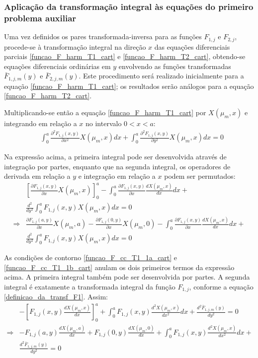 \subsubsection{Aplicação da transformação integral às equações do primeiro problema auxiliar}\label{secao_reciprocidade_F}

Uma vez definidos os pares transformada-inversa para as funções $F_{1,j}$ e $F_{2,j}$, procede-se à transformação integral na direção $x$ das equações
diferenciais parciais \eqref{funcao_F_harm_T1_cart} e \eqref{funcao_F_harm_T2_cart}, obtendo-se equações diferenciais ordinárias em $y$ envolvendo
as funções transformadas $\bar{F}_{1,j,m}(y)$ e $\bar{F}_{2,j,m}(y)$. Este procedimento será realizado inicialmente para a equação \eqref{funcao_F_harm_T1_cart};
os resultados serão análogos para a equação \eqref{funcao_F_harm_T2_cart}.

Multiplicando-se então a equação \eqref{funcao_F_harm_T1_cart} por $X(\mu_m, x)$ e integrando em relação a $x$ no intervalo $0 < x < a$: 
\begin{align}
	& \int_0^a  \frac{\partial^2 F_{1,j}(x, y)}{\partial x^2}X(\mu_m, x)dx + \int_0^a \frac{\partial^2 F_{1,j}(x, y)}{\partial y^2}X(\mu_m, x)dx = 0 
\end{align}

Na expressão acima, a primeira integral pode ser desenvolvida através de integração por partes, enquanto que na segunda integral, os operadores de derivada
em relação a $y$ e integração em relação a $x$ podem ser permutados:
\begin{align}
	& \left[ \frac{\partial F_{1,j}(x, y)}{\partial x}X(\mu_m, x) \right]_0^a
	-
	\int_0^a  \frac{\partial F_{1,j}(x, y)}{\partial x}\frac{dX(\mu_m, x)}{dx} dx + \nonumber \\
	& \frac{d^2}{d y^2}\int_0^a F_{1,j}(x, y)X(\mu_m, x)dx = 0 \nonumber \\ 
	\Rightarrow & \frac{\partial F_{1,j}(a, y)}{\partial x}X(\mu_m, a) - \frac{\partial F_{1,j}(0, y)}{\partial x}X(\mu_m, 0)
	-
	\int_0^a  \frac{\partial F_{1,j}(x, y)}{\partial x}\frac{dX(\mu_m, x)}{dx} dx + \nonumber \\
	& \frac{d^2}{d y^2}\int_0^a F_{1,j}(x, y)X(\mu_m, x)dx = 0
\end{align}

As condições de contorno \eqref{funcao_F_cc_T1_1a_cart} e \eqref{funcao_F_cc_T1_1b_cart} anulam os dois primeiros termos da expressão acima. A primeira
integral também pode ser desenvolvida por partes. A segunda integral é exatamente a transformada integral da função $F_{1, j}$, conforme a equação \eqref{definicao_da_transf_F1}.
Assim:
\begin{align}
	&
	- \left[ F_{1,j}(x, y)\frac{dX(\mu_m, x)}{dx} \right]_0^a
	+ \int_0^a  F_{1,j}(x, y)\frac{d^2X(\mu_m, x)}{dx^2} dx + \frac{d^2 \bar{F}_{1,j,m}(y)}{d y^2} = 0 \nonumber \\
	\Rightarrow &
	- F_{1,j}(a, y)\frac{dX(\mu_m, a)}{dx}+ F_{1,j}(0, y)\frac{dX(\mu_m, 0)}{dx} + \int_0^a  F_{1,j}(x, y)\frac{d^2X(\mu_m, x)}{dx^2} dx + \nonumber \\
	& \frac{d^2 \bar{F}_{1,j,m}(y)}{d y^2} = 0
\end{align}

